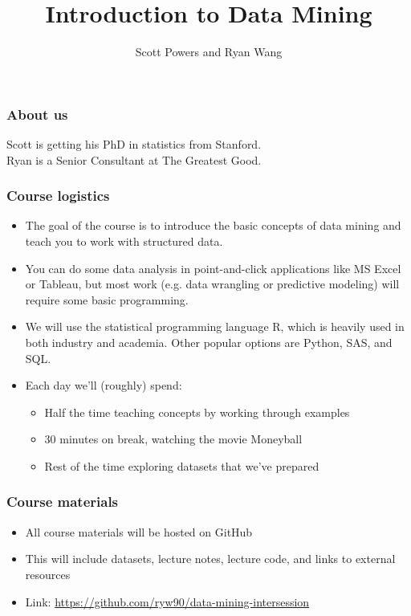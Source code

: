 \documentclass{beamer}
\title{Introduction to Data Mining}
\author{Scott Powers and Ryan Wang}
\begin{document}
\begin{frame}
\titlepage
\end{frame}

\begin{frame}
\frametitle{About us}
\begin{multicols}{2}
Scott is getting his PhD in statistics from Stanford. \\
\columnbreak
Ryan is a Senior Consultant at The Greatest Good.
\end{multicols}
\end{frame}

\begin{frame}
\frametitle{Course logistics}
\begin{itemize}
	\item The goal of the course is to introduce the basic concepts of data mining and teach you to work with structured data.
	\item You can do some data analysis in point-and-click applications like MS Excel or Tableau, but most work (e.g. data wrangling or predictive modeling) will require some basic programming.
	\item We will use the statistical programming language R, which is heavily used in both industry and academia. Other popular options are Python, SAS, and SQL.
	\item Each day we'll (roughly) spend:
	\begin{itemize}
		\item Half the time teaching concepts by working through examples
		\item 30 minutes on break, watching the movie Moneyball
		\item Rest of the time exploring datasets that we've prepared
	\end{itemize}
\end{itemize}
\end{frame}

\begin{frame}
\frametitle{Course materials}
\begin{itemize}
	\item All course materials will be hosted on GitHub
	\item This will include datasets, lecture notes, lecture code, and links to external resources
	\item Link: \url{https://github.com/ryw90/data-mining-intersession}
\end{itemize}
\end{frame}
\end{document}
